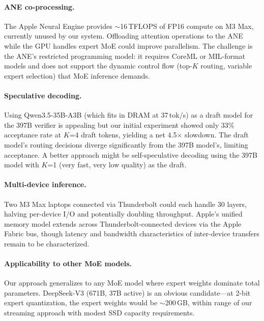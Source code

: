 \documentclass[11pt,twocolumn]{article}
\begin{document}
\paragraph{ANE co-processing.}
The Apple Neural Engine provides $\sim$16\,TFLOPS of FP16 compute on M3 Max, currently unused by our system.
Offloading attention operations to the ANE while the GPU handles expert MoE could improve parallelism.
The challenge is the ANE's restricted programming model: it requires CoreML or MIL-format models and does not support the dynamic control flow (top-$K$ routing, variable expert selection) that MoE inference demands.

\paragraph{Speculative decoding.}
Using Qwen3.5-35B-A3B (which fits in DRAM at 37\,tok/s) as a draft model for the 397B verifier is appealing but our initial experiment showed only 33\% acceptance rate at $K$=4 draft tokens, yielding a net 4.5$\times$ slowdown.
The draft model's routing decisions diverge significantly from the 397B model's, limiting acceptance.
A better approach might be self-speculative decoding using the 397B model with $K$=1 (very fast, very low quality) as the draft.

\paragraph{Multi-device inference.}
Two M3 Max laptops connected via Thunderbolt could each handle 30 layers, halving per-device I/O and potentially doubling throughput.
Apple's unified memory model extends across Thunderbolt-connected devices via the Apple Fabric bus, though latency and bandwidth characteristics of inter-device transfers remain to be characterized.

\paragraph{Applicability to other MoE models.}
Our approach generalizes to any MoE model where expert weights dominate total parameters.
DeepSeek-V3 (671B, 37B active) is an obvious candidate---at 2-bit expert quantization, the expert weights would be $\sim$200\,GB, within range of our streaming approach with modest SSD capacity requirements.

\end{document}
